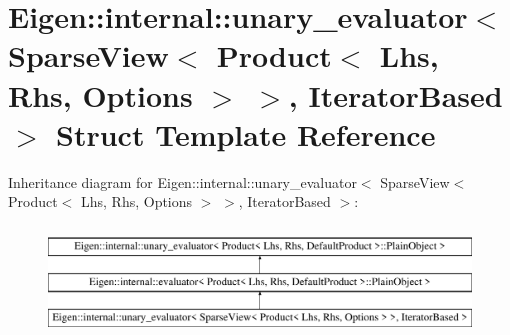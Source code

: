 \hypertarget{struct_eigen_1_1internal_1_1unary__evaluator_3_01_sparse_view_3_01_product_3_01_lhs_00_01_rhs_00009027121becdbd7ae7cc0d8a4c63ed7}{}\section{Eigen\+::internal\+::unary\+\_\+evaluator$<$ Sparse\+View$<$ Product$<$ Lhs, Rhs, Options $>$ $>$, Iterator\+Based $>$ Struct Template Reference}
\label{struct_eigen_1_1internal_1_1unary__evaluator_3_01_sparse_view_3_01_product_3_01_lhs_00_01_rhs_00009027121becdbd7ae7cc0d8a4c63ed7}
Inheritance diagram for Eigen\+::internal\+::unary\+\_\+evaluator$<$ Sparse\+View$<$ Product$<$ Lhs, Rhs, Options $>$ $>$, Iterator\+Based $>$\+:\begin{figure}[H]
\begin{center}
\leavevmode
\includegraphics[height=2.952548cm]{struct_eigen_1_1internal_1_1unary__evaluator_3_01_sparse_view_3_01_product_3_01_lhs_00_01_rhs_00009027121becdbd7ae7cc0d8a4c63ed7}
\end{center}
\end{figure}
